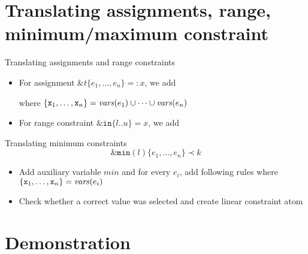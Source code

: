 \documentclass[11pt]{beamer}
\begin{document}
\section{Translating assignments, range, minimum/maximum constraint}
\begin{frame}{Translating assignments and range constraints}
 \begin{itemize}
    \item For assignment $\mathtt{\&}t\mathtt{\{}e_1,\dots,e_n\mathtt{\}} =: x$, we add
    \pause
    
    where $\{\mathtt{x}_1,\dots,\mathtt{x}_n\}=\mathit{vars}(e_1)\cup\dots\cup\mathit{vars}(e_n)$
    \pause
    \item For range constraint $\mathtt{\&in}\mathtt{\{}l\mathtt{..}u{\}} = x$, we add
    \pause
    
 \end{itemize}
\end{frame}

\begin{frame}{Translating minimum constraints}
\[\mathtt{\&min}(l)\mathtt{\{}e_1,\dots,e_n\mathtt{\}} \prec k\]
\pause
 \begin{itemize}
    \item Add auxiliary variable $\mathit{min}$ and for every $e_i$, add following rules where $\{\mathtt{x}_1,\dots,\mathtt{x}_n\}=\mathit{vars}(e_i)$ 
    
    \item Check whether a correct value was selected and create linear constraint atom
    
 \end{itemize}
\end{frame}

\section{Demonstration}
\end{document}
